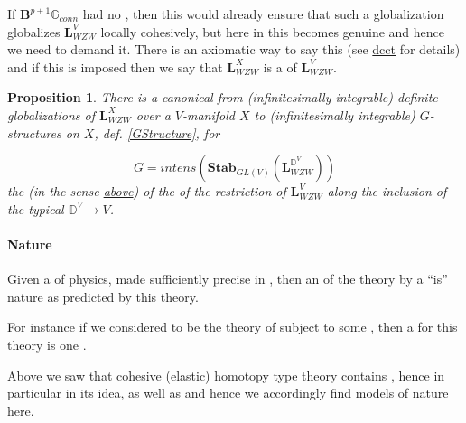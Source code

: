 \documentclass[12pt,titlepage]{article}
\theoremstyle{plain}
\newtheorem{prop}{Proposition}
\theoremstyle{definition}
\theoremstyle{remark}
\begin{document}
If $\mathbf{B}^{p+1}\mathbb{G}_{conn}$ had no , then this would already ensure that such a globalization globalizes $\mathbf{L}_{WZW}^V$ locally cohesively, but here in  this  becomes genuine  and hence we need to demand it. There is an axiomatic way to say this (see \hyperlink{dcct}{dcct} for details) and if this is imposed then we say that $\mathbf{L}_{WZW}^X$ is a  of $\mathbf{L}_{WZW}^V$.

\begin{prop}
\label{DefiniteGlobalizationsToGStructure}\hypertarget{DefiniteGlobalizationsToGStructure}{}
There is a canonical  from (infinitesimally integrable) definite globalizations of $\mathbf{L}_{WZW}^X$ over a $V$-manifold $X$ to (infinitesimally integrable) $G$-structures on $X$, def. \ref{GStructure}, for

\begin{displaymath}
G = intens(\mathbf{Stab}_{GL(V)}(\mathbf{L}_{WZW}^{\mathbb{D}^V}))
\end{displaymath}
the  (in the sense \hyperlink{IntensiveExtensive}{above}) of the  of the restriction of $\mathbf{L}_{WZW}^V$ along the inclusion of the typical  $\mathbb{D}^V \to V$.

\end{prop}
\hypertarget{nature}{}\paragraph*{{Nature}}\label{nature}

Given a  of physics, made sufficiently precise in , then an  of the theory by a  ``is'' nature as predicted by this theory.

For instance if we considered  to be the theory of  subject to some , then a  for this theory is one  .

Above we saw that cohesive (elastic) homotopy type theory contains , hence in particular  in its idea, as well as  and hence we accordingly find models of nature here.
\end{document}

